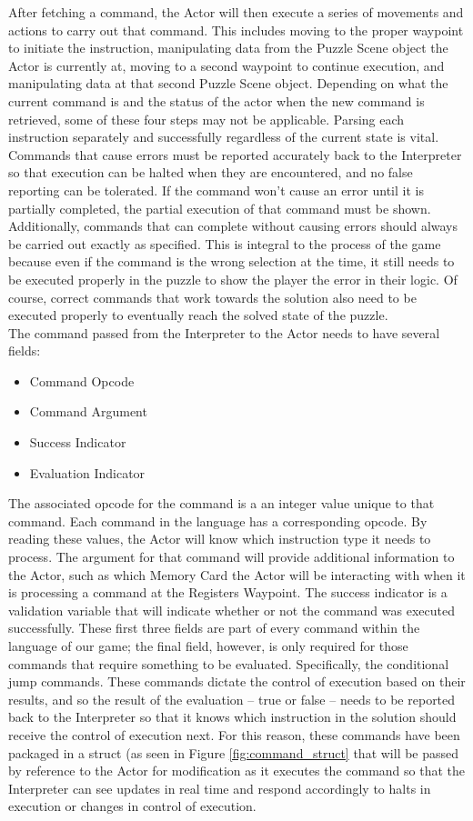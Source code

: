 After fetching a command, the Actor will then execute a series of movements and actions to carry out that command. This includes moving to the proper waypoint to initiate the instruction, manipulating data from the Puzzle Scene object the Actor is currently at, moving to a second waypoint to continue execution, and manipulating data at that second Puzzle Scene object. Depending on what the current command is and the status of the actor when the new command is retrieved, some of these four steps may not be applicable. Parsing each instruction separately and successfully regardless of the current state is vital. Commands that cause errors must be reported accurately back to the Interpreter so that execution can be halted when they are encountered, and no false reporting can be tolerated. If the command won't cause an error until it is partially completed, the partial execution of that command must be shown. Additionally, commands that can complete without causing errors should always be carried out exactly as specified. This is integral to the process of the game because even if the command is the wrong selection at the time, it still needs to be executed properly in the puzzle to show the player the error in their logic. Of course, correct commands that work towards the solution also need to be executed properly to eventually reach the solved state of the puzzle.\\

The command passed from the Interpreter to the Actor needs to have several fields:
\begin{itemize}
	\item Command Opcode
	\item Command Argument
	\item Success Indicator
	\item Evaluation Indicator
\end{itemize}
The associated opcode for the command is a an integer value unique to that command. Each command in the language has a corresponding opcode. By reading these values, the Actor will know which instruction type it needs to process. The argument for that command will provide additional information to the Actor, such as which Memory Card the Actor will be interacting with when it is processing a command at the Registers Waypoint. The success indicator is a validation variable that will indicate whether or not the command was executed successfully. These first three fields are part of every command within the language of our game; the final field, however, is only required for those commands that require something to be evaluated. Specifically, the conditional jump commands. These commands dictate the control of execution based on their results, and so the result of the evaluation -- true or false -- needs to be reported back to the Interpreter so that it knows which instruction in the solution should receive the control of execution next. For this reason, these commands have been packaged in a struct (as seen in Figure \ref{fig:command_struct} that will be passed by reference to the Actor for modification as it executes the command so that the Interpreter can see updates in real time and respond accordingly to halts in execution or changes in control of execution.\\


